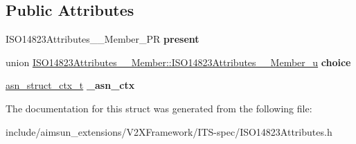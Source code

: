 \subsection*{Public Attributes}
\begin{DoxyCompactItemize}
\item 
I\+S\+O14823\+Attributes\+\_\+\+\_\+\+Member\+\_\+\+PR {\bfseries present}\hypertarget{structISO14823Attributes____Member_a80e09ba7b73f6129ec662f45398baf96}{}\label{structISO14823Attributes____Member_a80e09ba7b73f6129ec662f45398baf96}

\item 
union \hyperlink{unionISO14823Attributes____Member_1_1ISO14823Attributes____Member__u}{I\+S\+O14823\+Attributes\+\_\+\+\_\+\+Member\+::\+I\+S\+O14823\+Attributes\+\_\+\+\_\+\+Member\+\_\+u} {\bfseries choice}\hypertarget{structISO14823Attributes____Member_aba5123ac9e43a5051053ac1f53b95ccd}{}\label{structISO14823Attributes____Member_aba5123ac9e43a5051053ac1f53b95ccd}

\item 
\hyperlink{structasn__struct__ctx__s}{asn\+\_\+struct\+\_\+ctx\+\_\+t} {\bfseries \+\_\+asn\+\_\+ctx}\hypertarget{structISO14823Attributes____Member_ab566e8e53c6c2bbdac0a12ad28b84bbe}{}\label{structISO14823Attributes____Member_ab566e8e53c6c2bbdac0a12ad28b84bbe}

\end{DoxyCompactItemize}


The documentation for this struct was generated from the following file\+:\begin{DoxyCompactItemize}
\item 
include/aimsun\+\_\+extensions/\+V2\+X\+Framework/\+I\+T\+S-\/spec/I\+S\+O14823\+Attributes.\+h\end{DoxyCompactItemize}
